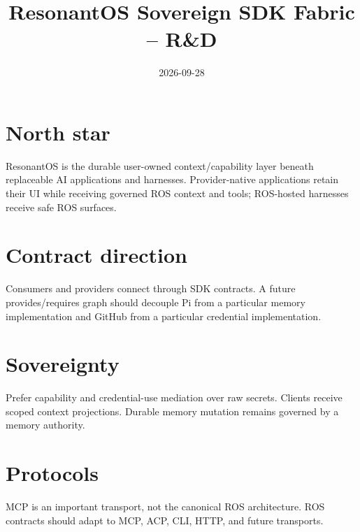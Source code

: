 \documentclass[11pt]{article}
\title{ResonantOS Sovereign SDK Fabric -- R\&D}\date{2026-09-28}
\begin{document}
\maketitle
\section{North star}
ResonantOS is the durable user-owned context/capability layer beneath replaceable AI applications and harnesses. Provider-native applications retain their UI while receiving governed ROS context and tools; ROS-hosted harnesses receive safe ROS surfaces.
\section{Contract direction}
Consumers and providers connect through SDK contracts. A future provides/requires graph should decouple Pi from a particular memory implementation and GitHub from a particular credential implementation.
\section{Sovereignty}
Prefer capability and credential-use mediation over raw secrets. Clients receive scoped context projections. Durable memory mutation remains governed by a memory authority.
\section{Protocols}
MCP is an important transport, not the canonical ROS architecture. ROS contracts should adapt to MCP, ACP, CLI, HTTP, and future transports.
\end{document}

